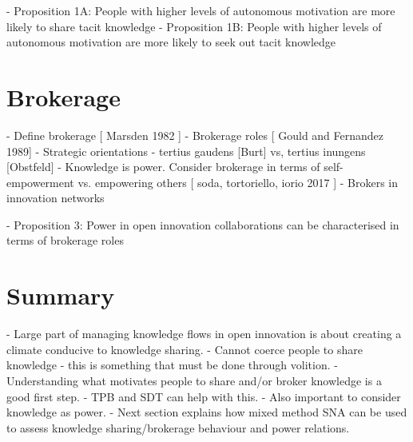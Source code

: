 - Proposition 1A: People with higher levels of autonomous motivation are more likely to share tacit knowledge
- Proposition 1B: People with higher levels of autonomous motivation are more likely to seek out tacit knowledge


\section{Brokerage}

- Define brokerage [ Marsden 1982 ]
- Brokerage roles [ Gould and Fernandez 1989]
- Strategic orientations - tertius gaudens [Burt] vs, tertius inungens [Obstfeld]
- Knowledge is power. Consider brokerage in terms of self-empowerment vs. empowering others [ soda, tortoriello, iorio 2017 ]
- Brokers in innovation networks

- Proposition 3: Power in open innovation collaborations can be characterised in terms of brokerage roles 

\section{Summary}

- Large part of managing knowledge flows in open innovation is about creating a climate conducive to knowledge sharing.
- Cannot coerce people to share knowledge - this is something that must be done through volition.
- Understanding what motivates people to share and/or broker knowledge is a good first step.
- TPB and SDT can help with this.
- Also important to consider knowledge as power.
- Next section explains how mixed method SNA can be used to assess knowledge sharing/brokerage behaviour and power relations. 



